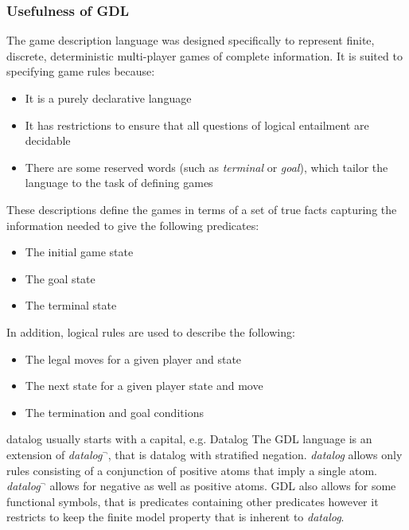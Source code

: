 \subsubsection{Usefulness of GDL}
The game description language was designed specifically to represent finite, discrete, deterministic multi-player games of complete information. It is suited to specifying game rules because:
\begin{itemize}
\item It is a purely declarative language
\item It has restrictions to ensure that all questions of logical entailment are decidable
\item There are some reserved words (such as \textit{terminal} or \textit{goal}), which tailor the language to the task of defining games
\end{itemize}
These descriptions define the games in terms of a set of true facts capturing the information needed to give the following predicates:
\begin{itemize}
\item The initial game state
\item The goal state
\item The terminal state
\end{itemize}
In addition, logical rules are used to describe the following:
\begin{itemize}
\item The legal moves for a given player and state
\item The next state for a given player state and move
\item The termination and goal conditions
\end{itemize}

\ac{datalog usually starts with a capital, e.g. Datalog}
The GDL language is an extension of \textit{datalog$^{\neg}$}, that is datalog with stratified negation\cite{GDL_Spec}. \textit{datalog} allows only rules consisting of a conjunction of positive atoms that imply a single atom. \textit{datalog$^{\neg}$} allows for negative as well as positive atoms\cite{Alice/Foundations}. GDL also allows for some functional symbols, that is predicates containing other predicates however it restricts to keep the finite model property that is inherent to \textit{datalog}\cite{GDL_Spec}.

